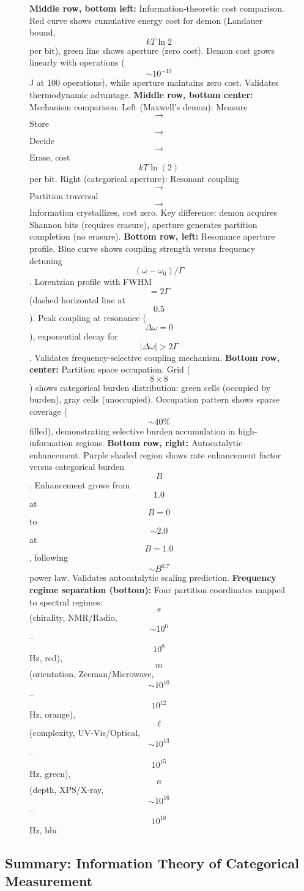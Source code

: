 \begin{figure}[htbp]
{    \textbf{Middle row, bottom left:} Information-theoretic cost comparison. Red curve shows cumulative energy cost for demon (Landauer bound, $$kT\ln 2$$ per bit), green line shows aperture (zero cost). Demon cost grows linearly with operations ($$\sim 10^{-19}$$ J at 100 operations), while aperture maintains zero cost. Validates thermodynamic advantage. 
    \textbf{Middle row, bottom center:} Mechanism comparison. Left (Maxwell's demon): Measure $$\to$$ Store $$\to$$ Decide $$\to$$ Erase, cost $$kT\ln(2)$$ per bit. Right (categorical aperture): Resonant coupling $$\to$$ Partition traversal $$\to$$ Information crystallizes, cost zero. Key difference: demon acquires Shannon bits (requires erasure), aperture generates partition completion (no erasure). 
    \textbf{Bottom row, left:} Resonance aperture profile. Blue curve shows coupling strength versus frequency detuning $$(\omega - \omega_0)/\Gamma$$. Lorentzian profile with FWHM $$= 2\Gamma$$ (dashed horizontal line at $$0.5$$). Peak coupling at resonance ($$\Delta\omega = 0$$), exponential decay for $$|\Delta\omega| > 2\Gamma$$. Validates frequency-selective coupling mechanism. 
    \textbf{Bottom row, center:} Partition space occupation. Grid ($$8 \times 8$$) shows categorical burden distribution: green cells (occupied by burden), gray cells (unoccupied). Occupation pattern shows sparse coverage ($$\sim 40\%$$ filled), demonstrating selective burden accumulation in high-information regions. 
    \textbf{Bottom row, right:} Autocatalytic enhancement. Purple shaded region shows rate enhancement factor versus categorical burden $$B$$. Enhancement grows from $$1.0$$ at $$B=0$$ to $$\sim 2.0$$ at $$B=1.0$$, following $$\sim B^{0.7}$$ power law. Validates autocatalytic scaling prediction. 
    \textbf{Frequency regime separation (bottom):} Four partition coordinates mapped to spectral regimes: $$s$$ (chirality, NMR/Radio, $$\sim 10^6$$--$$10^8$$ Hz, red), $$m$$ (orientation, Zeeman/Microwave, $$\sim 10^{10}$$--$$10^{12}$$ Hz, orange), $$\ell$$ (complexity, UV-Vis/Optical, $$\sim 10^{13}$$--$$10^{15}$$ Hz, green), $$n$$ (depth, XPS/X-ray, $$\sim 10^{16}$$--$$10^{18}$$ Hz, blu}
    \label{fig:information_catalysis_validation}
    \end{figure}
\subsection{Summary: Information Theory of Categorical Measurement}

